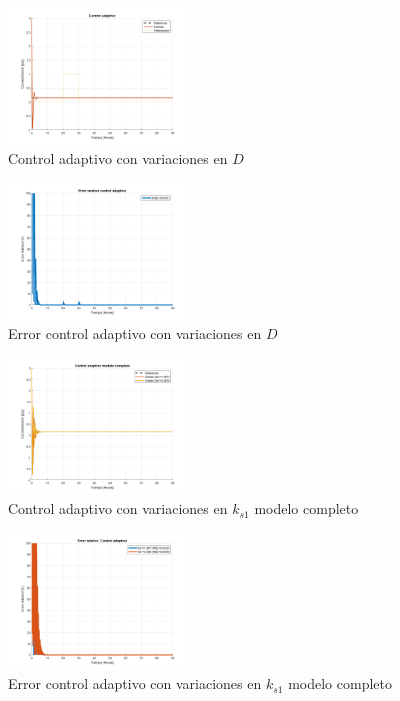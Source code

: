 \documentclass[letterpaper, 10 pt, conference]{ieeeconf}  %
\begin{document}
\begin{figure}[H]
  \centering
  \includegraphics[width=0.43\textwidth]{./Images_tp3/ad_D.png}
  \caption{Control adaptivo con variaciones en $D$}
\end{figure}
\begin{figure}[H]
  \centering
  \includegraphics[width=0.43\textwidth]{./Images_tp3/ad_err_D.png}
  \caption{Error control adaptivo con variaciones en $D$}
\end{figure}

\begin{figure}[H]
  \centering
  \includegraphics[width=0.43\textwidth]{./Images_tp3/ad_completo.png}
  \caption{Control adaptivo con variaciones en $k_{s1}$ modelo completo}
\end{figure}
\begin{figure}[H]
  \centering
  \includegraphics[width=0.43\textwidth]{./Images_tp3/ad_completo_err.png}
  \caption{Error control adaptivo con variaciones en $k_{s1}$ modelo completo}
\end{figure}
\end{document}
